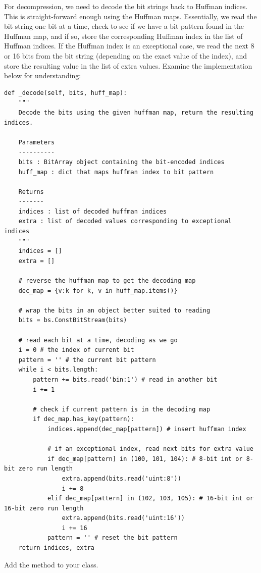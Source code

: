 For decompression, we need to decode the bit strings back to Huffman indices.
This is straight-forward enough using the Huffman maps.
Essentially, we read the bit string one bit at a time, check to see if we have a bit pattern
found in the Huffman map, and if so, store the corresponding Huffman index in the list of Huffman indices.
If the Huffman index is an exceptional case, we read the next 8 or 16 bits from
the bit string (depending on the exact value of the index), and store the resulting
value in the list of extra values.
Examine the implementation below for understanding:
\begin{lstlisting}
def _decode(self, bits, huff_map):
    """
    Decode the bits using the given huffman map, return the resulting indices.

    Parameters
    ----------
    bits : BitArray object containing the bit-encoded indices
    huff_map : dict that maps huffman index to bit pattern

    Returns
    -------
    indices : list of decoded huffman indices
    extra : list of decoded values corresponding to exceptional indices
    """
    indices = []
    extra = []

    # reverse the huffman map to get the decoding map
    dec_map = {v:k for k, v in huff_map.items()}

    # wrap the bits in an object better suited to reading
    bits = bs.ConstBitStream(bits)

    # read each bit at a time, decoding as we go
    i = 0 # the index of current bit
    pattern = '' # the current bit pattern
    while i < bits.length:
        pattern += bits.read('bin:1') # read in another bit
        i += 1

        # check if current pattern is in the decoding map
        if dec_map.has_key(pattern):
            indices.append(dec_map[pattern]) # insert huffman index

            # if an exceptional index, read next bits for extra value
            if dec_map[pattern] in (100, 101, 104): # 8-bit int or 8-bit zero run length
                extra.append(bits.read('uint:8'))
                i += 8
            elif dec_map[pattern] in (102, 103, 105): # 16-bit int or 16-bit zero run length
                extra.append(bits.read('uint:16'))
                i += 16
            pattern = '' # reset the bit pattern
    return indices, extra
\end{lstlisting}

\begin{problem}
Add the  method to your class.
\end{problem}

